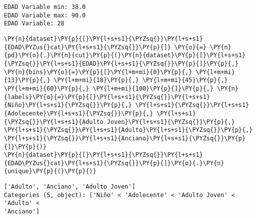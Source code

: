     \begin{Verbatim}[commandchars=\\\{\}]
EDAD Variable min: 38.0
EDAD Variable max: 90.0
EDAD Variable: 28
    \end{Verbatim}

    \begin{tcolorbox}[breakable, size=fbox, boxrule=1pt, pad at break*=1mm,colback=cellbackground, colframe=cellborder]
\begin{Verbatim}[commandchars=\\\{\}]
\PY{n}{dataset}\PY{p}{[}\PY{l+s+s1}{\PYZsq{}}\PY{l+s+s1}{EDAD\PYZus{}cat}\PY{l+s+s1}{\PYZsq{}}\PY{p}{]} \PY{o}{=} \PY{n}{pd}\PY{o}{.}\PY{n}{cut}\PY{p}{(}\PY{n}{dataset}\PY{p}{[}\PY{l+s+s1}{\PYZsq{}}\PY{l+s+s1}{EDAD}\PY{l+s+s1}{\PYZsq{}}\PY{p}{]}\PY{p}{,} \PY{n}{bins}\PY{o}{=}\PY{p}{[}\PY{l+m+mi}{0}\PY{p}{,} \PY{l+m+mi}{13}\PY{p}{,} \PY{l+m+mi}{18}\PY{p}{,} \PY{l+m+mi}{45}\PY{p}{,} \PY{l+m+mi}{60}\PY{p}{,} \PY{l+m+mi}{100}\PY{p}{]}\PY{p}{,} \PY{n}{labels}\PY{o}{=}\PY{p}{[}\PY{l+s+s1}{\PYZsq{}}\PY{l+s+s1}{Niño}\PY{l+s+s1}{\PYZsq{}}\PY{p}{,} \PY{l+s+s1}{\PYZsq{}}\PY{l+s+s1}{Adolecente}\PY{l+s+s1}{\PYZsq{}}\PY{p}{,} \PY{l+s+s1}{\PYZsq{}}\PY{l+s+s1}{Adulto Joven}\PY{l+s+s1}{\PYZsq{}}\PY{p}{,} \PY{l+s+s1}{\PYZsq{}}\PY{l+s+s1}{Adulto}\PY{l+s+s1}{\PYZsq{}}\PY{p}{,} \PY{l+s+s1}{\PYZsq{}}\PY{l+s+s1}{Anciano}\PY{l+s+s1}{\PYZsq{}}\PY{p}{]}\PY{p}{)}
\PY{n}{dataset}\PY{p}{[}\PY{l+s+s1}{\PYZsq{}}\PY{l+s+s1}{EDAD\PYZus{}cat}\PY{l+s+s1}{\PYZsq{}}\PY{p}{]}\PY{o}{.}\PY{n}{unique}\PY{p}{(}\PY{p}{)}
\end{Verbatim}
\end{tcolorbox}

            \begin{tcolorbox}[breakable, size=fbox, boxrule=.5pt, pad at break*=1mm, opacityfill=0]
\begin{Verbatim}[commandchars=\\\{\}]
['Adulto', 'Anciano', 'Adulto Joven']
Categories (5, object): ['Niño' < 'Adolecente' < 'Adulto Joven' < 'Adulto' <
'Anciano']
\end{Verbatim}
\end{tcolorbox}
        
